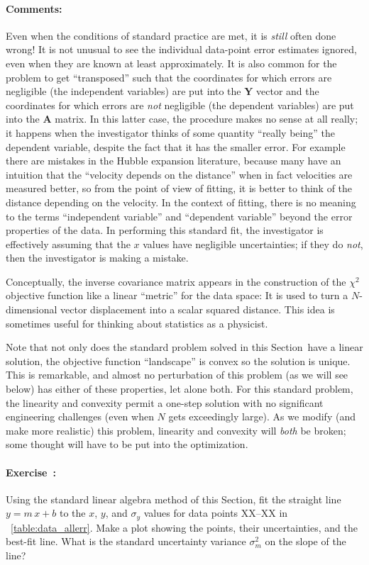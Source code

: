\documentclass[12pt]{article}
\newcommand{\sectionname}{Section}
\newcommand{\problemname}{Exercise}
\newcommand{\commentsname}{Comments}
\newcounter{problem}
\newenvironment{problem}{\paragraph{\problemname~\theproblem:}\refstepcounter{problem}}{}
\newenvironment{comments}{\paragraph{\commentsname:}}{}
\newcommand{\mmatrix}[1]{\boldsymbol{#1}}
\newcommand{\mA}{\mmatrix{A}}
\newcommand{\mY}{\mmatrix{Y}}
\begin{document}
\begin{comments}
Even when the conditions of standard practice are met, it is
\emph{still} often done wrong!  It is not unusual to see the
individual data-point error estimates ignored, even when they are
known at least approximately.  It is also common for the problem to
get ``transposed'' such that the coordinates for which errors are
negligible (the independent variables) are put into the $\mY$ vector
and the coordinates for which errors are \emph{not} negligible (the
dependent variables) are put into the $\mA$ matrix.  In this latter
case, the procedure makes no sense at all really; it happens when the
investigator thinks of some quantity ``really being'' the dependent
variable, despite the fact that it has the smaller error.  For example
there are mistakes in the Hubble expansion literature, because many
have an intuition that the ``velocity depends on the distance'' when
in fact velocities are measured better, so from the point of view of
fitting, it is better to think of the distance depending on the
velocity.  In the context of fitting, there is no meaning to the terms
``independent variable'' and ``dependent variable'' beyond the error
properties of the data.  In performing this standard fit, the
investigator is effectively assuming that the $x$ values have
negligible uncertainties; if they do \emph{not}, then the investigator
is making a mistake.

Conceptually, the inverse covariance matrix appears in the
construction of the $\chi^2$ objective function like a linear
``metric'' for the data space: It is used to turn a $N$-dimensional
vector displacement into a scalar squared distance.  This idea is
sometimes useful for thinking about statistics as a physicist.

Note that not only does the standard problem solved in this
\sectionname\ have a linear solution, the objective function
``landscape'' is convex so the solution is unique.  This is
remarkable, and almost no perturbation of this problem (as we will see
below) has either of these properties, let alone both.  For this
standard problem, the linearity and convexity permit a one-step
solution with no significant engineering challenges (even when $N$
gets exceedingly large).  As we modify (and make more realistic) this
problem, linearity and convexity will \emph{both} be broken; some
thought will have to be put into the optimization.
\end{comments}

\begin{problem}\label{prob:easy}
Using the standard linear algebra method of this \sectionname, fit the
straight line $y=m\,x+b$ to the $x$, $y$, and $\sigma_y$ values for
data points XX--XX in \tablename~\ref{table:data_allerr}.  Make a plot
showing the points, their uncertainties, and the best-fit line.  What
is the standard uncertainty variance $\sigma_m^2$ on the slope of the
line?
\end{problem}
\end{document}
